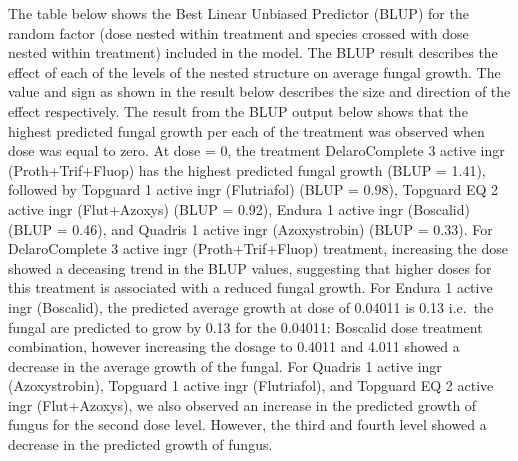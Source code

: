 \documentclass[
  10pt,
  letterpaper,
  twocolumn]{article}
\begin{document}
The table below shows the Best Linear Unbiased Predictor (BLUP) for the
random factor (dose nested within treatment and species crossed with
dose nested within treatment) included in the model. The BLUP result
describes the effect of each of the levels of the nested structure on
average fungal growth. The value and sign as shown in the result below
describes the size and direction of the effect respectively. The result
from the BLUP output below shows that the highest predicted fungal
growth per each of the treatment was observed when dose was equal to
zero. At dose = 0, the treatment DelaroComplete 3 active ingr
(Proth+Trif+Fluop) has the highest predicted fungal growth (BLUP =
1.41), followed by Topguard 1 active ingr (Flutriafol) (BLUP = 0.98),
Topguard EQ 2 active ingr (Flut+Azoxys) (BLUP = 0.92), Endura 1 active
ingr (Boscalid) (BLUP = 0.46), and Quadris 1 active ingr (Azoxystrobin)
(BLUP = 0.33). For DelaroComplete 3 active ingr (Proth+Trif+Fluop)
treatment, increasing the dose showed a deceasing trend in the BLUP
values, suggesting that higher doses for this treatment is associated
with a reduced fungal growth. For Endura 1 active ingr (Boscalid), the
predicted average growth at dose of 0.04011 is 0.13 i.e.~the fungal are
predicted to grow by 0.13 for the 0.04011: Boscalid dose treatment
combination, however increasing the dosage to 0.4011 and 4.011 showed a
decrease in the average growth of the fungal. For Quadris 1 active ingr
(Azoxystrobin), Topguard 1 active ingr (Flutriafol), and Topguard EQ 2
active ingr (Flut+Azoxys), we also observed an increase in the predicted
growth of fungus for the second dose level. However, the third and
fourth level showed a decrease in the predicted growth of fungus.
\end{document}
